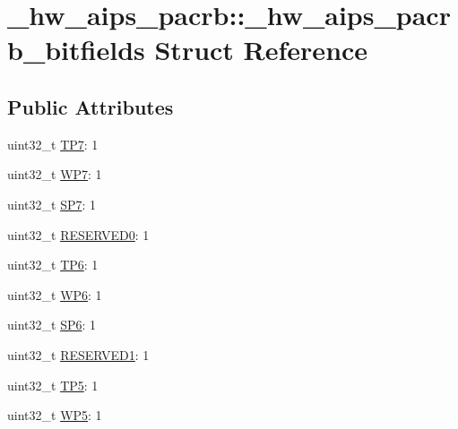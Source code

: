 \hypertarget{struct__hw__aips__pacrb_1_1__hw__aips__pacrb__bitfields}{}\section{\+\_\+hw\+\_\+aips\+\_\+pacrb\+:\+:\+\_\+hw\+\_\+aips\+\_\+pacrb\+\_\+bitfields Struct Reference}
\label{struct__hw__aips__pacrb_1_1__hw__aips__pacrb__bitfields}
\subsection*{Public Attributes}
\begin{DoxyCompactItemize}
\item 
uint32\+\_\+t \hyperlink{struct__hw__aips__pacrb_1_1__hw__aips__pacrb__bitfields_a33eb6d84cb3796ff60ac144761d4c569}{T\+P7}\+: 1
\item 
uint32\+\_\+t \hyperlink{struct__hw__aips__pacrb_1_1__hw__aips__pacrb__bitfields_aa5a5555c1d2bbfb4b7daad9c158549c4}{W\+P7}\+: 1
\item 
uint32\+\_\+t \hyperlink{struct__hw__aips__pacrb_1_1__hw__aips__pacrb__bitfields_a9dec7f24844a29f9747c255c2357d6af}{S\+P7}\+: 1
\item 
uint32\+\_\+t \hyperlink{struct__hw__aips__pacrb_1_1__hw__aips__pacrb__bitfields_a41d29054e3a381a30e760978c9ae690d}{R\+E\+S\+E\+R\+V\+E\+D0}\+: 1
\item 
uint32\+\_\+t \hyperlink{struct__hw__aips__pacrb_1_1__hw__aips__pacrb__bitfields_a8cbb02eb947869356401fa937962c187}{T\+P6}\+: 1
\item 
uint32\+\_\+t \hyperlink{struct__hw__aips__pacrb_1_1__hw__aips__pacrb__bitfields_a779a793b4083130f75ed421b9ae149d0}{W\+P6}\+: 1
\item 
uint32\+\_\+t \hyperlink{struct__hw__aips__pacrb_1_1__hw__aips__pacrb__bitfields_ab6f28e860c95c2c594547b2d4bc5ed65}{S\+P6}\+: 1
\item 
uint32\+\_\+t \hyperlink{struct__hw__aips__pacrb_1_1__hw__aips__pacrb__bitfields_a86ce97bf0ddae2776501fc3145f965c3}{R\+E\+S\+E\+R\+V\+E\+D1}\+: 1
\item 
uint32\+\_\+t \hyperlink{struct__hw__aips__pacrb_1_1__hw__aips__pacrb__bitfields_a43ed7900d0cc581adbb2c58afe8656c4}{T\+P5}\+: 1
\item 
uint32\+\_\+t \hyperlink{struct__hw__aips__pacrb_1_1__hw__aips__pacrb__bitfields_af3b463f90e6845bb23d6a16970eee09e}{W\+P5}\+: 1

\end{DoxyCompactItemize}
